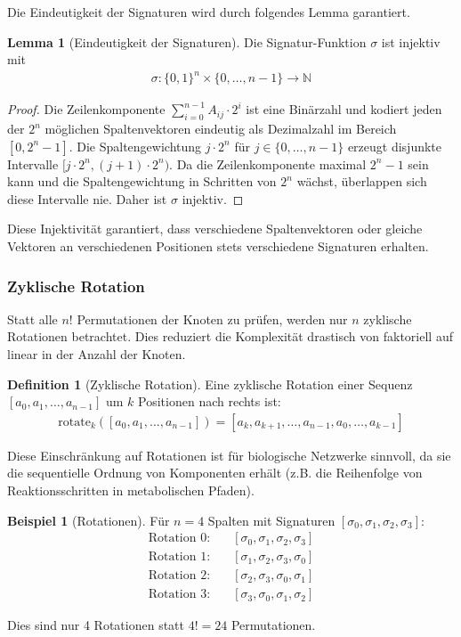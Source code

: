 ﻿\documentclass[a4paper,12pt]{article}
\theoremstyle{definition}
\newtheorem{definition}{Definition}
\newtheorem{beispiel}{Beispiel}
\newtheorem{lemma}{Lemma}
\begin{document}
Die Eindeutigkeit der Signaturen wird durch folgendes Lemma garantiert.
\begin{lemma}[Eindeutigkeit der Signaturen]
	Die Signatur-Funktion $\sigma$ ist injektiv mit
	\begin{align}
		\sigma: \{0,1\}^n \times \{0,\ldots,n-1\} \to \mathbb{N}
	\end{align}
\end{lemma}

\begin{proof}
	Die Zeilenkomponente $\sum_{i=0}^{n-1} A_{ij} \cdot 2^i$ ist eine Binärzahl und kodiert jeden der $2^n$ möglichen Spaltenvektoren eindeutig als Dezimalzahl im Bereich $[0, 2^n-1]$. Die Spaltengewichtung $j \cdot 2^n$ für $j \in \{0,\ldots,n-1\}$ erzeugt disjunkte Intervalle $[j \cdot 2^n, (j+1) \cdot 2^n)$. Da die Zeilenkomponente maximal $2^n - 1$ sein kann und die Spaltengewichtung in Schritten von $2^n$ wächst, überlappen sich diese Intervalle nie. Daher ist $\sigma$ injektiv.
\end{proof}

Diese Injektivität garantiert, dass verschiedene Spaltenvektoren oder gleiche Vektoren an verschiedenen Positionen stets verschiedene Signaturen erhalten.

\subsubsection{Zyklische Rotation}

Statt alle $n!$ Permutationen der Knoten zu prüfen, werden nur $n$ zyklische Rotationen betrachtet. Dies reduziert die Komplexität drastisch von faktoriell auf linear in der Anzahl der Knoten.

\begin{definition}[Zyklische Rotation]
	Eine zyklische Rotation einer Sequenz $[a_0, a_1, \ldots, a_{n-1}]$ um $k$ Positionen nach rechts ist:
	\begin{align}
		\text{rotate}_k([a_0, a_1, \ldots, a_{n-1}]) = [a_k, a_{k+1}, \ldots, a_{n-1}, a_0, \ldots, a_{k-1}]
	\end{align}
\end{definition}

Diese Einschränkung auf Rotationen ist für biologische Netzwerke sinnvoll, da sie die sequentielle Ordnung von Komponenten erhält (z.B. die Reihenfolge von Reaktionsschritten in metabolischen Pfaden).

\begin{beispiel}[Rotationen]
	Für $n=4$ Spalten mit Signaturen $[\sigma_0, \sigma_1, \sigma_2, \sigma_3]$:
	\begin{align*}
		\text{Rotation 0:} & \quad [\sigma_0, \sigma_1, \sigma_2, \sigma_3] \\
		\text{Rotation 1:} & \quad [\sigma_1, \sigma_2, \sigma_3, \sigma_0] \\
		\text{Rotation 2:} & \quad [\sigma_2, \sigma_3, \sigma_0, \sigma_1] \\
		\text{Rotation 3:} & \quad [\sigma_3, \sigma_0, \sigma_1, \sigma_2]
	\end{align*}
	
	Dies sind nur 4 Rotationen statt $4! = 24$ Permutationen.
\end{beispiel}
\end{document}
